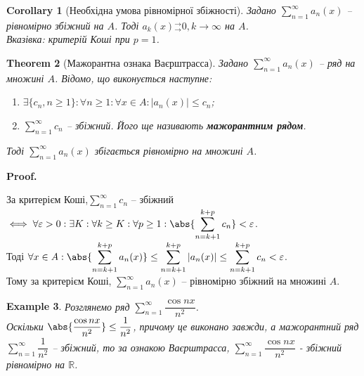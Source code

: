 \documentclass[a4paper, 10pt]{article}
\makeatletter
\def\huge{\displaystyle}
\def\qed{$\blacksquare$}
\theoremstyle{theoremdd}
\newtheorem{theorem}{Theorem}[subsection]
\theoremstyle{theoremdd}
\theoremstyle{theoremdd}
\theoremstyle{theoremdd}
\theoremstyle{theoremdd}
\newtheorem{example}[theorem]{Example}
\theoremstyle{theoremdd}
\theoremstyle{theoremdd}
\theoremstyle{theoremdd}
\theoremstyle{theoremdd}
\newtheorem{corollary}[theorem]{Corollary}
\renewenvironment{proof}[1][Proof.\\]{\par
\pushQED{\hfill \qed}%
\normalfont \topsep6\p@\@plus6\p@\relax
\trivlist
\item\relax
{\bfseries
#1\@addpunct{.}}\hspace\labelsep\ignorespaces
}{%
\popQED\endtrivlist\@endpefalse
}
\newcommand{\tounif}{^\rightarrow_\rightarrow}
\makeatother
\begin{document}
\begin{corollary}[Необхідна умова рівномірної збіжності]
Задано $\huge\sum_{n=1}^\infty a_n(x)$ -- рівномірно збіжний на $A$. Тоді $a_k(x){}\tounif 0, k \to \infty$ на $A$.\\
\textit{Вказівка: критерій Коші при $p = 1$.}
\end{corollary}

\begin{theorem}[Мажорантна ознака Ваєрштрасса]
Задано $\huge \sum_{n=1}^\infty a_n(x)$ -- ряд на множині $A$. Відомо, що виконується наступне:
\begin{enumerate}[nosep,wide=0pt,label={\arabic*)}]
\item $\exists \{c_n, n \geq 1\}: \forall n \geq 1: \forall x \in A: |a_n(x)| \leq c_n$;\\
\item $\huge \sum_{n=1}^\infty c_n$ -- збіжний. Його ще називають \textbf{мажорантним рядом}.
\end{enumerate}
Тоді $\huge \sum_{n=1}^\infty a_n(x)$ збігається рівномірно на множині $A$.
\end{theorem}

\begin{proof}
За критерієм Коші,$\huge \sum_{n=1}^\infty c_n$ -- збіжний $\iff \forall \varepsilon > 0: \exists K: \forall k \geq K: \forall p \geq 1: \huge \abs{\sum_{n=k+1}^{k+p} c_n} < \varepsilon$. \\
Тоді $\forall x \in A: \huge\abs{\sum_{n=k+1}^{k+p} a_n(x)} \leq \sum_{n=k+1}^{k+p} |a_n(x)| \leq \sum_{n=k+1}^{k+p} c_n < \varepsilon$.\\
Тому за критерієм Коші, $\huge \sum_{n=1}^\infty a_n(x)$ -- рівномірно збіжний на множині $A$.
\end{proof}

\begin{example}
Розглянемо ряд $\huge\sum_{n=1}^\infty \dfrac{\cos nx}{n^2}$.\\
Оскільки $\abs{\dfrac{\cos nx}{n^2}} \leq \dfrac{1}{n^2}$, причому це виконано завжди, а мажорантний ряд $\huge\sum_{n=1}^\infty \dfrac{1}{n^2}$ -- збіжний, то за ознакою Ваєрштрасса, $\huge\sum_{n=1}^\infty \dfrac{\cos nx}{n^2}$ - збіжний рівномірно на $\mathbb{R}$.
\end{example}
\end{document}
